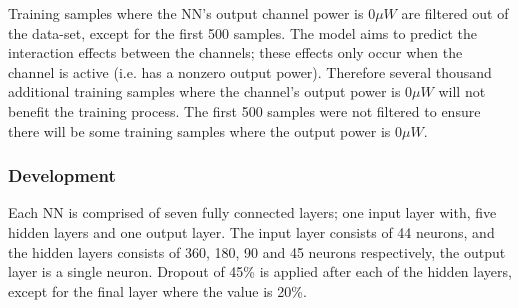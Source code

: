 Training samples where the NN's output channel power is $0\mu W$ are filtered out of the data-set, except for the first 500 samples. The model aims to predict the interaction effects between the channels; these effects only occur when the channel is active (i.e. has a nonzero output power). Therefore several thousand additional training samples where the channel's output power is $0\mu W$ will not benefit the training process. The first 500 samples were not filtered to ensure there will be some training samples where the output power is $0\mu W$.



\subsubsection{Development}

Each NN is comprised of seven fully connected layers; one input layer with, five hidden layers and one output layer. The input layer consists of 44 neurons, and the hidden layers consists of 360, 180, 90 and 45 neurons respectively, the output layer is a single neuron. Dropout of 45\% is applied after each of the hidden layers, except for the final layer where the value is 20\%.


